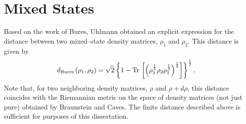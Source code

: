 \section{Mixed States}

Based on the work of Bures\cite{Bures:69},
Uhlmann\cite{Uhlmann:76} obtained an explicit expression for the 
distance between two mixed--state density matrices,
$\rho_1$ and $\rho_2$.  This 
distance is given by
\begin{equation}
d_{\text{Bures}}\left(\rho_1,\rho_2\right)
= \sqrt{2} \left\lbrace
    1 - {\operatorname{Tr}\,}\left[ 
            \left( \rho_1^\frac{1}{2} \rho_2 \rho_1^\frac{1}{2}
            \right)^\frac{1}{2}
           \right]
\right\rbrace^\frac{1}{2}.
\end{equation}
Note that, for two neighboring density matrices, 
$\rho$ and $\rho + d\rho$,
this distance coincides with the Riemannian metric on the
space of density matrices (not just pure) obtained by
Braunstein and Caves\cite{Braunstein/Caves:94}.
The finite distance described above is sufficient 
for purposes of this dissertation.
